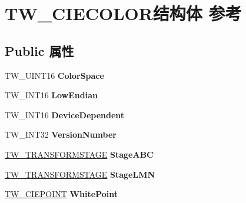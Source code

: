 \hypertarget{struct_t_w___c_i_e_c_o_l_o_r}{}\section{T\+W\+\_\+\+C\+I\+E\+C\+O\+L\+O\+R结构体 参考}
\label{struct_t_w___c_i_e_c_o_l_o_r}
\subsection*{Public 属性}
\begin{DoxyCompactItemize}
\item 
\mbox{\label{struct_t_w___c_i_e_c_o_l_o_r_a07c8239a33bddaac6f7d827a35a7cada}} 
T\+W\+\_\+\+U\+I\+N\+T16 {\bfseries Color\+Space}
\item 
\mbox{\label{struct_t_w___c_i_e_c_o_l_o_r_a6b1505adac4ca91ec565f94ddeb35309}} 
T\+W\+\_\+\+I\+N\+T16 {\bfseries Low\+Endian}
\item 
\mbox{\label{struct_t_w___c_i_e_c_o_l_o_r_a8290e44148cd45d7d83b61f0d0c25723}} 
T\+W\+\_\+\+I\+N\+T16 {\bfseries Device\+Dependent}
\item 
\mbox{\label{struct_t_w___c_i_e_c_o_l_o_r_a5b152a055cd7efa298411fd73b03fd4d}} 
T\+W\+\_\+\+I\+N\+T32 {\bfseries Version\+Number}
\item 
\mbox{\label{struct_t_w___c_i_e_c_o_l_o_r_a130dd9f7193bfcc67456038a440122ff}} 
\hyperlink{struct_t_w___t_r_a_n_s_f_o_r_m_s_t_a_g_e}{T\+W\+\_\+\+T\+R\+A\+N\+S\+F\+O\+R\+M\+S\+T\+A\+GE} {\bfseries Stage\+A\+BC}
\item 
\mbox{\label{struct_t_w___c_i_e_c_o_l_o_r_a78463e5ff016696abf9e3f6e191f6707}} 
\hyperlink{struct_t_w___t_r_a_n_s_f_o_r_m_s_t_a_g_e}{T\+W\+\_\+\+T\+R\+A\+N\+S\+F\+O\+R\+M\+S\+T\+A\+GE} {\bfseries Stage\+L\+MN}
\item 
\mbox{\label{struct_t_w___c_i_e_c_o_l_o_r_a503f8cac1c5ea94ce01678bcf55be87e}} 
\hyperlink{struct_t_w___c_i_e_p_o_i_n_t}{T\+W\+\_\+\+C\+I\+E\+P\+O\+I\+NT} {\bfseries White\+Point}
\item 

\end{DoxyCompactItemize}

